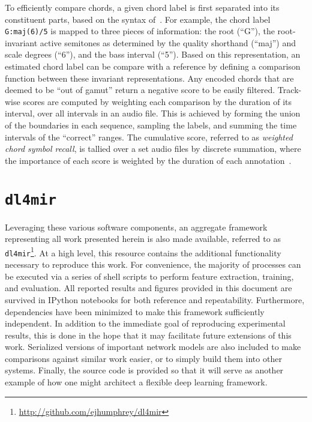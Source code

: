 To efficiently compare chords, a given chord label is first separated into its
constituent parts, based on the syntax of~\cite{Harte2010Towards}.
For example, the chord label \texttt{G:maj(6)/5} is mapped to three pieces of information: the root (``G''), the root-invariant active semitones as determined by the quality shorthand (``maj'') and scale degrees (``6''), and the bass interval (``5'').
Based on this representation, an estimated chord label can be compare with a reference by defining a comparison function between these invariant representations.
Any encoded chords that are deemed to be ``out of gamut'' return a negative score to be easily filtered.
Track-wise scores are computed by weighting each comparison by the duration of its interval, over all intervals in an audio file.
This is achieved by forming the union of the boundaries in each sequence, sampling the labels, and summing the time intervals of the ``correct'' ranges.
The cumulative score, referred to as \emph{weighted chord symbol recall}, is tallied over a set audio files by discrete summation, where the importance of each score is weighted by the duration of each annotation~\cite{Mauch2010Automatic}.


\section{\texttt{dl4mir}}
\label{sec:dl4mir}

Leveraging these various software components, an aggregate framework representing all work presented herein is also made available, referred to as \texttt{dl4mir}\footnote{\url{http://github.com/ejhumphrey/dl4mir}}.
At a high level, this resource contains the additional functionality necessary to reproduce this work.
For convenience, the majority of processes can be executed via a series of shell scripts to perform feature extraction, training, and evaluation.
All reported results and figures provided in this document are survived in IPython notebooks for both reference and repeatability.
Furthermore, dependencies have been minimized to make this framework sufficiently independent.
In addition to the immediate goal of reproducing experimental results, this is done in the hope that it may facilitate future extensions of this work.
Serialized versions of important network models are also included to make comparisons against similar work easier, or to simply build them into other systems.
Finally, the source code is provided so that it will serve as another example of how one might architect a flexible deep learning framework.


